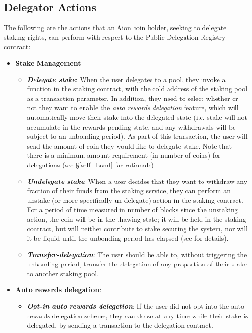 \subsection{Delegator Actions}
The following are the actions that an Aion coin holder, seeking to delegate staking rights, can perform with respect to the Public Delegation Registry contract: 
\begin{itemize}
    \item \textbf{Stake Management}
    \begin{itemize}
        \item \textit{\textbf{Delegate stake}}: When the user delegates to a pool, they invoke a function in the staking contract, with the cold address of the staking pool as a transaction parameter. In addition, they need to select whether or not they want to enable the \textit{auto rewards delegation} feature, which will automatically move their stake into the delegated state (i.e. stake will not accumulate in the rewards-pending state, and any withdrawals will be subject to an unbonding period). As part of this transaction, the user will send the amount of coin they would like to delegate-stake. Note that there is a minimum amount requirement (in number of coins) for delegations (see \S\ref{self_bond} for rationale). 
        \item \textit{\textbf{Undelegate stake}}: When a user decides that they want to withdraw any fraction of their funds from the staking service, they can perform an unstake (or more specifically un-delegate) action in the staking contract. For a period of time measured in number of blocks since the unstaking action, the coin will be in the thawing state; it will be held in the staking contract, but will neither contribute to stake securing the system, nor will it be liquid until the unbonding period has elapsed (see \cite{WZS19} for details).
        \item \textit{\textbf{Transfer-delegation}}: The user should be able to, without triggering the unbonding period, transfer the delegation of any proportion of their stake to another staking pool.
    \end{itemize}
    \item \textbf{Auto rewards delegation}: 
    \begin{itemize}
        \item \textit{\textbf{Opt-in auto rewards delegation}}: If the user did not opt into the auto-rewards delegation scheme, they can do so at any time while their stake is delegated, by sending a transaction to the delegation contract. 

\end{itemize}
\end{itemize}
